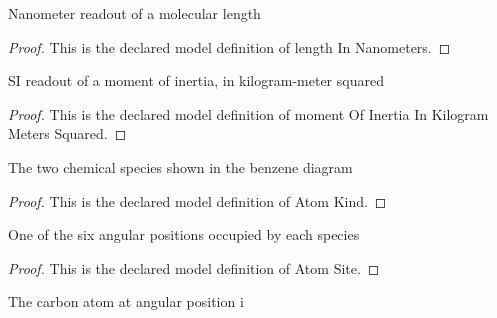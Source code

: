 \begin{definition}
  \label{def:physics:phyx-mini-0538:phyxminiproblems-problemphyxmini0538-lengthinnanometers}
  Nanometer readout of a molecular length
\end{definition}
\begin{proof}
  This is the declared model definition of length In Nanometers.
\end{proof}
\begin{definition}
  \label{def:physics:phyx-mini-0538:phyxminiproblems-problemphyxmini0538-momentofinertiainkilogrammeterssquared}
  SI readout of a moment of inertia, in kilogram-meter squared
\end{definition}
\begin{proof}
  This is the declared model definition of moment Of Inertia In Kilogram Meters Squared.
\end{proof}
\begin{definition}
  \label{def:physics:phyx-mini-0538:phyxminiproblems-problemphyxmini0538-atomkind}
  The two chemical species shown in the benzene diagram
\end{definition}
\begin{proof}
  This is the declared model definition of Atom Kind.
\end{proof}
\begin{definition}
  \label{def:physics:phyx-mini-0538:phyxminiproblems-problemphyxmini0538-atomsite}
  One of the six angular positions occupied by each species
\end{definition}
\begin{proof}
  This is the declared model definition of Atom Site.
\end{proof}
\begin{definition}
  \label{def:physics:phyx-mini-0538:phyxminiproblems-problemphyxmini0538-carbonsite}
  The carbon atom at angular position i
\end{definition}
